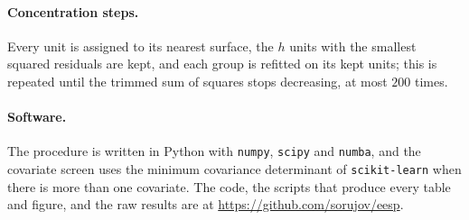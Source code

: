 \paragraph{Concentration steps.}
Every unit is assigned to its nearest surface, the $h$ units with the smallest squared
residuals are kept, and each group is refitted on its kept units; this is repeated until the
trimmed sum of squares stops decreasing, at most $200$ times.

\paragraph{Software.}
The procedure is written in Python with \texttt{numpy}, \texttt{scipy} and \texttt{numba}, and
the covariate screen uses the minimum covariance determinant of \texttt{scikit-learn} when
there is more than one covariate. The code, the scripts that produce every table and figure,
and the raw results are at \url{https://github.com/sorujov/eesp}.
